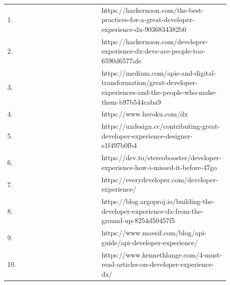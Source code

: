 \documentclass[english, 12pt, a4paper, sci, utf8, a-1b, online]{aaltothesis}
\begin{document}
\begin{center}
  \begin{longtable}{p{0.05\linewidth}p{0.35\linewidth}p{0.5\linewidth}}
    \label{table:grey-literature}                                                                                                                                                                    \\
    1.  & \textcite{the-best-practices-for-a-great-dx}                    & https://hackernoon.com/the-best-practices-for-a-great-developer-experience-dx-9036834382b0                               \\
    2.  & \textcite{dx-devs-are-people-too}                               & https://hackernoon.com/developer-experience-dx-devs-are-people-too-6590d6577afe                                          \\
    3.  & \textcite{great-dx-and-the-people-who-make-them}                & https://medium.com/apis-and-digital-transformation/great-developer-experiences-and-the-people-who-make-them-b97b544caba9 \\
    4.  & \textcite{heroku-dx}                                            & https://www.heroku.com/dx                                                                                                \\
    5.  & \textcite{contributing-as-a-designer}                           & https://uxdesign.cc/contributing-great-developer-experience-designer-e1f497b0fb4                                         \\
    6.  & \textcite{how-i-missed-it-before}                               & https://dev.to/stereobooster/developer-experience-how-i-missed-it-before-47go                                            \\
    7.  & \textcite{what-is-developer-experience-everydeveloper}          & https://everydeveloper.com/developer-experience/                                                                         \\
    8.  & \textcite{building-the-developer-experience-from-the-ground-up} & https://blog.argoproj.io/building-the-developer-experience-dx-from-the-ground-up-8254d50457f5                            \\
    9.  & \textcite{api-developer-experience-dx-resources}                & https://www.moesif.com/blog/api-guide/api-developer-experience/                                                          \\
    10. & \textcite{4-must-read-articles-on-developer-experience}         & https://www.kennethlange.com/4-must-read-articles-on-developer-experience-dx/                                            \\

\end{longtable}
\end{center}
\end{document}

